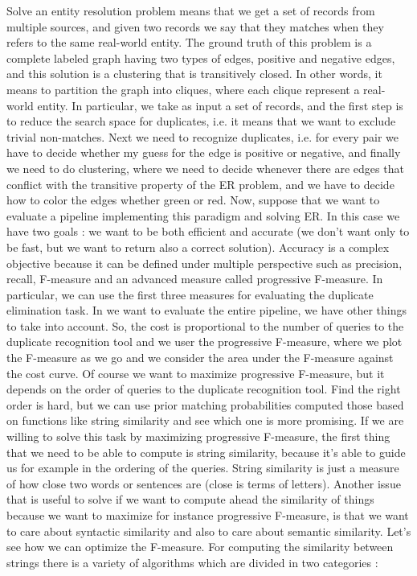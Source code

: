 \documentclass[11pt]{article}
\begin{document}
Solve an entity resolution problem means that we get a set of records from multiple sources, and given two records we say that they matches when they refers to the same real-world entity. The ground truth of this problem is a complete labeled graph having two types of edges, positive and negative edges, and this solution is a clustering that is transitively closed. In other words, it means to partition the graph into cliques, where each clique represent a real-world entity. In particular, we take as input a set of records, and the first step is to reduce the search space for duplicates, i.e. it means that we want to exclude trivial non-matches. Next we need to recognize duplicates, i.e. for every pair we have to decide whether my guess for the edge is positive or negative, and finally we need to do clustering, where we need to decide whenever there are edges that conflict with the transitive property of the ER problem, and we have to decide how to color the edges whether green or red. Now, suppose that we want to evaluate a pipeline implementing this paradigm and solving ER. In this case we have two goals : we want to be both efficient and accurate (we don't want only to be fast, but we want to return also a correct solution). Accuracy is a complex objective because it can be defined under multiple perspective such as precision, recall, F-measure and an advanced measure called progressive F-measure. In particular, we can use the first three measures for evaluating the duplicate elimination task. In we want to evaluate the entire pipeline, we have other things to take into account. So, the cost is proportional to the number of queries to the duplicate recognition tool and we user the progressive F-measure, where we plot the F-measure as we go and we consider the area under the F-measure against the cost curve. Of course we want to maximize progressive F-measure, but it depends on the order of queries to the duplicate recognition tool. Find the right order is hard, but we can use prior matching probabilities computed those based on functions like string similarity and see which one is more promising. If we are willing to solve this task by maximizing progressive F-measure, the first thing that we need to be able to compute is string similarity, because it's able to guide us for example in the ordering of the queries. String similarity is just a measure of how close two words or sentences are (close is terms of letters). Another issue that is useful to solve if we want to compute ahead the similarity of things because we want to maximize for instance progressive F-measure, is that we want to care about syntactic similarity and also to care about semantic similarity. Let's see how we can optimize the F-measure. For computing the similarity between strings there is a variety of algorithms which are divided in two categories : 
\end{document}
